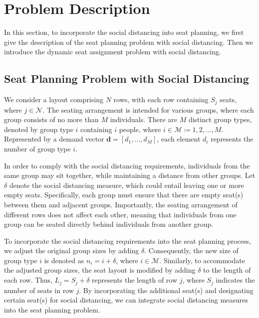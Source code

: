 \section{Problem Description}
In this section, to incorporate the social distancing into seat planning, we first give the description of the seat planning problem with social distancing. Then we introduce the dynamic seat assignment problem with social distancing.


\subsection{Seat Planning Problem with Social Distancing}\label{dynamic_demand}
We consider a layout comprising $N$ rows, with each row containing $S_j$ seats, where $j \in \mathcal{N}$. The seating arrangement is intended for various groups, where each group consists of no more than $M$ individuals. There are $M$ distinct group types, denoted by group type $i$ containing $i$ people, where $i \in \mathcal{M} \coloneqq {1,2, \ldots, M}$. Represented by a demand vector $\mathbf{d} = [d_1, \ldots, d_M]$, each element $d_i$ represents the number of group type $i$.


In order to comply with the social distancing requirements, individuals from the same group may sit together, while maintaining a distance from other groups. Let $\delta$ denote the social distancing measure, which could entail leaving one or more empty seats. Specifically, each group must ensure that there are empty seat(s) between them and adjacent groups. Importantly, the seating arrangement of different rows does not affect each other, meaning that individuals from one group can be seated directly behind individuals from another group.

To incorporate the social distancing requirements into the seat planning process, we adjust the original group sizes by adding $\delta$. Consequently, the new size of group type $i$ is denoted as $n_i = i + \delta$, where $i \in \mathcal{M}$. Similarly, to accommodate the adjusted group sizes, the seat layout is modified by adding $\delta$ to the length of each row. Thus, $L_j = S_j + \delta$ represents the length of row $j$, where $S_j$ indicates the number of seats in row $j$. By incorporating the additional seat(s) and designating certain seat(s) for social distancing, we can integrate social distancing measures into the seat planning problem.

